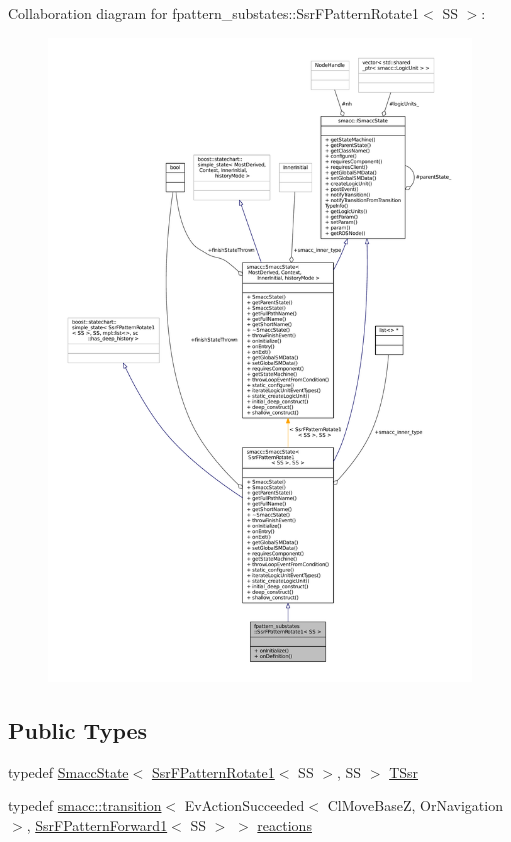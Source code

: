 Collaboration diagram for fpattern\+\_\+substates\+:\+:Ssr\+F\+Pattern\+Rotate1$<$ SS $>$\+:
\nopagebreak
\begin{figure}[H]
\begin{center}
\leavevmode
\includegraphics[width=350pt]{structfpattern__substates_1_1SsrFPatternRotate1__coll__graph}
\end{center}
\end{figure}
\subsection*{Public Types}
\begin{DoxyCompactItemize}
\item 
typedef \hyperlink{classSmaccState}{Smacc\+State}$<$ \hyperlink{structfpattern__substates_1_1SsrFPatternRotate1}{Ssr\+F\+Pattern\+Rotate1}$<$ SS $>$, SS $>$ \hyperlink{structfpattern__substates_1_1SsrFPatternRotate1_ad9030085117e1a9931a7148f4ab31f61}{T\+Ssr}
\item 
typedef \hyperlink{classsmacc_1_1transition}{smacc\+::transition}$<$ Ev\+Action\+Succeeded$<$ Cl\+Move\+BaseZ, Or\+Navigation $>$, \hyperlink{structfpattern__substates_1_1SsrFPatternForward1}{Ssr\+F\+Pattern\+Forward1}$<$ SS $>$ $>$ \hyperlink{structfpattern__substates_1_1SsrFPatternRotate1_a85f5bc7fd526d762ef63300b35d4b890}{reactions}
\end{DoxyCompactItemize}
